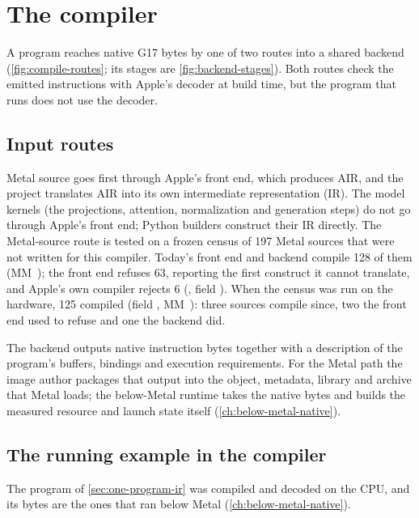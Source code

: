 \chapter{The compiler}\label{ch:compiling}

A program reaches native G17 bytes by one of two routes into a shared backend (\cref{fig:compile-routes}; its stages
are \cref{fig:backend-stages}). Both routes
check the emitted instructions with Apple's decoder at build time, but the program that runs does not use the decoder.

\section{Input routes}\label{ch:source-native-program}

Metal source goes first through Apple's front end, which produces AIR, and the project translates AIR into its own
intermediate representation (IR). The model kernels (the projections, attention, normalization and generation steps)
do not go through Apple's front end; Python builders construct their IR directly. The Metal-source route is tested on a frozen
census of 197 Metal sources that were not written for this compiler. Today's front end and backend compile 128 of them
(MM~); the front end refuses 63, reporting the first construct it cannot translate, and Apple's own compiler
rejects 6 (, field ). When the census was run on the hardware, 125
compiled (field , MM~): three sources compile since, two the front end used to refuse
and one the backend did.



The backend outputs native instruction bytes together with a description of the
program's buffers, bindings and execution requirements. For the Metal path the image author packages that output into
the object, metadata, library and archive that Metal loads; the below-Metal runtime takes the native bytes and builds
the measured resource and launch state itself (\cref{ch:below-metal-native}).

\section{The running example in the compiler}\label{ch:running-example-through}

The program of \cref{sec:one-program-ir} was compiled and decoded on the CPU, and its bytes are the ones that ran
below Metal (\cref{ch:below-metal-native}).

